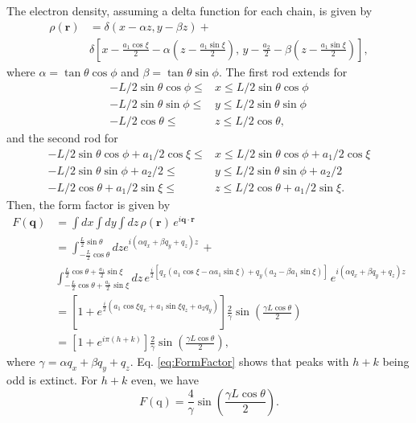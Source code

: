 \documentclass[12pt]{article}
\begin{document}
The electron density, assuming a delta function for each chain, is given by 
\begin{align}
	\rho(\mathbf{r})&=\delta(x-\alpha z, y-\beta z)+\\
	&\delta\left[x-\frac{a_1\cos\xi}{2}-\alpha\left(z-\frac{a_1\sin\xi}{2}\right),\, y-\frac{a_2}{2}-\beta\left(z-\frac{a_1\sin\xi}{2}\right)\right],
\end{align}
where $\alpha=\tan\theta\cos\phi$ and $\beta=\tan\theta\sin\phi$. The first rod extends for
\begin{align}%
	-L/2\sin\theta\cos\phi\leq &x\leq L/2\sin\theta\cos\phi\\ 
	-L/2\sin\theta\sin\phi\leq &y \leq L/2\sin\theta\sin\phi\\
	-L/2\cos\theta\leq &z \leq L/2\cos\theta,
\end{align}
and the second rod for
\begin{align}%
	-L/2\sin\theta\cos\phi+a_1/2\cos\xi\leq &x\leq L/2\sin\theta\cos\phi+a_1/2\cos\xi\\ 
	-L/2\sin\theta\sin\phi+a_2/2 \leq &y \leq L/2\sin\theta\sin\phi+a_2/2\\
	-L/2\cos\theta+a_1/2\sin\xi \leq &z \leq L/2\cos\theta+a_1/2\sin\xi.
\end{align}
Then, the form factor is given by
\begin{align}%
	F(\mathbf{q})&=\int dx\int dy\int dz\,\rho(\mathbf{r})\,e^{i\mathbf{q}\cdot\mathbf{r}}\\
	&=\int_{-\frac{L}{2}\cos\theta}^{\frac{L}{2}\sin\theta}dz e^{i(\alpha q_x+\beta q_y+q_z)z}\,+\nonumber\\
	&\int_{-\frac{L}{2}\cos\theta+\frac{a_1}{2}\sin\xi}^{\frac{L}{2}\cos\theta+\frac{a_1}{2}\sin\xi}dz\, e^{\frac{i}{2}\left[q_x\left(a_1\cos\xi-\alpha a_1\sin\xi\right)+q_y\left(a_2-\beta a_1\sin\xi\right)\right]}\,e^{i(\alpha q_x+\beta q_y+q_z)z}\nonumber\\
	&=\left[1+e^{\frac{i}{2}\left(a_1\cos\xi q_x+a_1\sin\xi q_z+a_2q_y\right)}\right]\frac{2}{\gamma}\sin\left(\frac{\gamma L\cos\theta}{2}\right)\nonumber\\
	&=\left[1+e^{i\pi(h+k)}\right]\frac{2}{\gamma}\sin\left(\frac{\gamma L\cos\theta}{2}\right)\label{eq:FormFactor},
\end{align}
where $\gamma=\alpha q_x+\beta q_y+q_z$. Eq. \ref{eq:FormFactor} shows that peaks with $h+k$ being odd is extinct. For $h+k$ even, we have
\begin{equation}%
	F(\mathrm{q})=\frac{4}{\gamma}\sin\left(\frac{\gamma L\cos\theta}{2}\right)\label{eq:FormFactorEven}.
\end{equation} 
\end{document}

